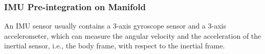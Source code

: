 \documentclass[journal,article,submit,moreauthors,pdftex]{Definitions/mdpi}
\begin{document}
\subsubsection{IMU Pre-integration on Manifold}
An IMU sensor usually contains a 3-axis gyroscope sensor and a 
3-axis accelerometer, which can measure the angular velocity and 
the acceleration of the inertial sensor, i.e., the body frame, 
with respect to the inertial frame. 

\end{document}
